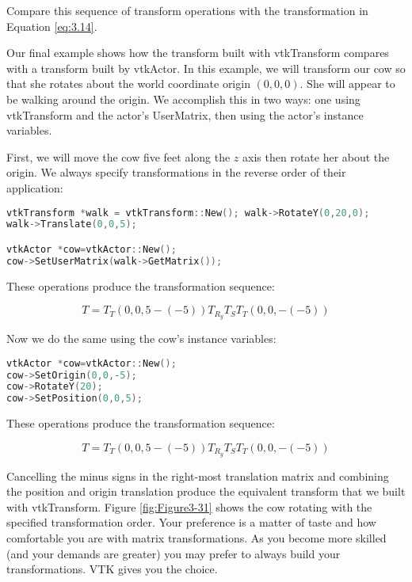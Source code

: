 Compare this sequence of transform operations with the transformation in Equation \eqref{eq:3.14}.

Our final example shows how the transform built with vtkTransform compares with a transform built by vtkActor. In this example, we will transform our cow so that she rotates about the world coordinate origin $(0,0,0)$. She will appear to be walking around the origin. We accomplish this in two ways: one using vtkTransform and the actor's UserMatrix, then using the actor's instance variables.

First, we will move the cow five feet along the $z$ axis then rotate her about the origin. We always specify transformations in the reverse order of their application:

\begin{lstlisting}[language=C++, caption={}]
vtkTransform *walk = vtkTransform::New(); walk->RotateY(0,20,0);
walk->Translate(0,0,5);

vtkActor *cow=vtkActor::New();
cow->SetUserMatrix(walk->GetMatrix());
\end{lstlisting}

These operations produce the transformation sequence:

\begin{equation}\label{eq:3.15}
T=T_T(0,0,5-(-5))T_{R_y}T_ST_T(0,0,-(-5))
\end{equation}

Now we do the same using the cow's instance variables:

\begin{lstlisting}[language=C++, caption={}]
vtkActor *cow=vtkActor::New();
cow->SetOrigin(0,0,-5);
cow->RotateY(20);
cow->SetPosition(0,0,5);
\end{lstlisting}

These operations produce the transformation sequence:

\begin{equation}\label{eq:3.16}
T=T_T(0,0,5-(-5))T_{R_y}T_ST_T(0,0,-(-5))
\end{equation}

Cancelling the minus signs in the right-most translation matrix and combining the position and origin translation produce the equivalent transform that we built with vtkTransform. Figure \ref{fig:Figure3-31} shows the cow rotating with the specified transformation order. Your preference is a matter of taste and how comfortable you are with matrix transformations. As you become more skilled (and your demands are greater) you may prefer to always build your transformations. VTK gives you the choice.

